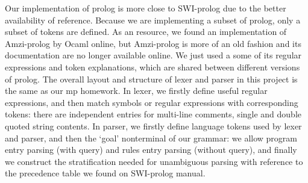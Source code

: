 Our implementation of prolog is more close to SWI-prolog due to the better availability of reference. Because we are implementing a subset of prolog, only a subset of tokens are defined. As an resource, we found an implementation of Amzi-prolog by Ocaml online\cite{gitcode}, but Amzi-prolog is more of an old fashion and its documentation are no longer available online. We just used a some of its regular expressions and token explanations, which are shared between different versions of prolog.
The overall layout and structure of lexer and parser in this project is the same as our mp homework. In lexer, we firstly define useful regular expressions, and then match symbols or regular expressions with corresponding tokens: there are independent entries for multi-line comments, single and double quoted string contents. In parser, we firstly define language tokens used by lexer and parser, and then the `goal' nonterminal of our grammar: we allow program entry parsing (with query) and rules entry parsing (without query), and finally we construct the stratification needed for unambiguous parsing with reference to the precedence table we found on SWI-prolog manual.

